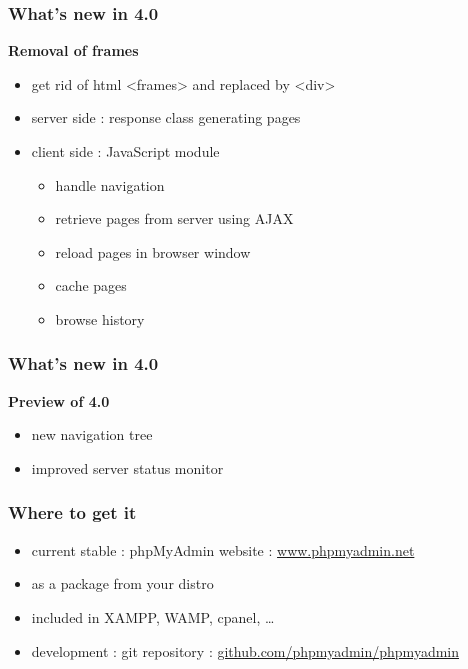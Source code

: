 \documentclass[14pt]{beamer}
\begin{document}
  \begin{frame}
    \frametitle{What's new in 4.0}
    \textbf{{\color{PmaOlive}Removal of frames}}
    \pause
    \begin{itemize}[<+->]
      \item get rid of html <frames> and replaced by <div>
      \item server side : response class generating pages
      \item client side : JavaScript module 
      \begin{itemize}[<+->]
	\item handle navigation
        \item retrieve pages from server using AJAX
        \item reload pages in browser window
	\item cache pages
	\item browse history
      \end{itemize}
    \end{itemize}
  \end{frame}
  \begin{frame}
    \frametitle{What's new in 4.0}
    \textbf{{\color{PmaOlive}Preview of 4.0}}
     \begin{itemize}
      \item new navigation tree
      \item improved server status monitor
    \end{itemize}
  \end{frame}
  \begin{frame}
    \frametitle{Where to get it}
    \begin{itemize}[<+->]
      \item current stable : phpMyAdmin website : \href{http://www.phpmyadmin.net/}{www.phpmyadmin.net}
      \item as a package from your distro
      \item included in XAMPP, WAMP, cpanel, \ldots
      \item development : git repository :  \href{https://github.com/phpmyadmin/phpmyadmin}{github.com/phpmyadmin/phpmyadmin}
    \end{itemize}
  \end{frame}
\end{document}
